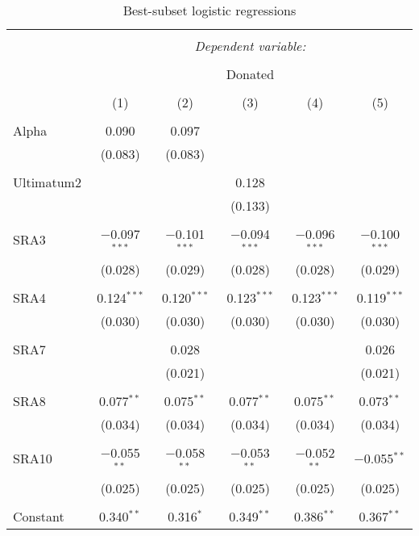 \begin{table}[H] \centering 
  \caption{Best-subset logistic regressions} 
  \label{} 
\begin{tabular}{@{\extracolsep{5pt}}lccccc} 
\\[-1.8ex]\hline 
\hline \\[-1.8ex] 
 & \multicolumn{5}{c}{\textit{Dependent variable:}} \\ 
\cline{2-6} 
\\[-1.8ex] & \multicolumn{5}{c}{Donated} \\ 
\\[-1.8ex] & (1) & (2) & (3) & (4) & (5)\\ 
\hline \\[-1.8ex] 
 Alpha & 0.090 & 0.097 &  &  &  \\ 
  & (0.083) & (0.083) &  &  &  \\ 
  & & & & & \\ 
 Ultimatum2 &  &  & 0.128 &  &  \\ 
  &  &  & (0.133) &  &  \\ 
  & & & & & \\ 
 SRA3 & $-$0.097$^{***}$ & $-$0.101$^{***}$ & $-$0.094$^{***}$ & $-$0.096$^{***}$ & $-$0.100$^{***}$ \\ 
  & (0.028) & (0.029) & (0.028) & (0.028) & (0.029) \\ 
  & & & & & \\ 
 SRA4 & 0.124$^{***}$ & 0.120$^{***}$ & 0.123$^{***}$ & 0.123$^{***}$ & 0.119$^{***}$ \\ 
  & (0.030) & (0.030) & (0.030) & (0.030) & (0.030) \\ 
  & & & & & \\ 
 SRA7 &  & 0.028 &  &  & 0.026 \\ 
  &  & (0.021) &  &  & (0.021) \\ 
  & & & & & \\ 
 SRA8 & 0.077$^{**}$ & 0.075$^{**}$ & 0.077$^{**}$ & 0.075$^{**}$ & 0.073$^{**}$ \\ 
  & (0.034) & (0.034) & (0.034) & (0.034) & (0.034) \\ 
  & & & & & \\ 
 SRA10 & $-$0.055$^{**}$ & $-$0.058$^{**}$ & $-$0.053$^{**}$ & $-$0.052$^{**}$ & $-$0.055$^{**}$ \\ 
  & (0.025) & (0.025) & (0.025) & (0.025) & (0.025) \\ 
  & & & & & \\ 
 Constant & 0.340$^{**}$ & 0.316$^{*}$ & 0.349$^{**}$ & 0.386$^{**}$ & 0.367$^{**}$ \\ 

\end{tabular}
\end{table}
